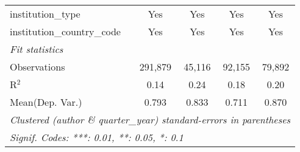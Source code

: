 \begin{tabular}{lcccc}
   institution\_type            & Yes           & Yes           & Yes           & Yes\\  
   institution\_country\_code   & Yes           & Yes           & Yes           & Yes\\  
   \midrule
   \emph{Fit statistics}\\
   Observations                 & 291,879       & 45,116        & 92,155        & 79,892\\  
   R$^2$                        & 0.14          & 0.24          & 0.18          & 0.20\\  
Mean(Dep. Var.) & 0.793 & 0.833 & 0.711 & 0.870 \\
   \midrule \midrule
   \multicolumn{5}{l}{\emph{Clustered (author \& quarter\_year) standard-errors in parentheses}}\\
   \multicolumn{5}{l}{\emph{Signif. Codes: ***: 0.01, **: 0.05, *: 0.1}}\\
\end{tabular}
\par\endgroup
